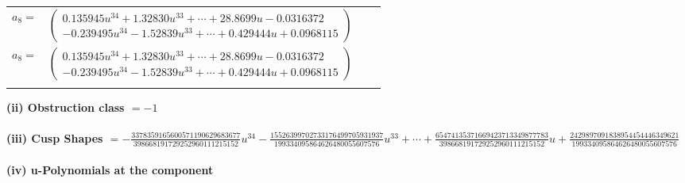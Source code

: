 \documentclass[1p]{elsarticle_modified}
\theoremstyle{definition}
\begin{document}
\begin{tabular}{m{7pt} m{180pt} m{7pt} m{180pt} }
\flushright $a_{8}=$&$\begin{pmatrix}0.135945 u^{34}+1.32830 u^{33}+\cdots+28.8699 u-0.0316372\\-0.239495 u^{34}-1.52839 u^{33}+\cdots+0.429444 u+0.0968115\end{pmatrix}$\\ \flushright $a_{8}=$&$\begin{pmatrix}0.135945 u^{34}+1.32830 u^{33}+\cdots+28.8699 u-0.0316372\\-0.239495 u^{34}-1.52839 u^{33}+\cdots+0.429444 u+0.0968115\end{pmatrix}$\\&\end{tabular}
\flushleft \textbf{(ii) Obstruction class $= -1$}\\~\\
\flushleft \textbf{(iii) Cusp Shapes $= -\frac{3378359165600571190629683677}{398668191729252960111215152} u^{34}-\frac{15526399702733176499705931937}{199334095864626480055607576} u^{33}+\cdots+\frac{65474135371669423713349877783}{398668191729252960111215152} u+\frac{2429897091838954454446349621}{199334095864626480055607576}$}\\~\\
\newpage\renewcommand{\arraystretch}{1}
\flushleft \textbf{(iv) u-Polynomials at the component}\newline \\
\end{document}
